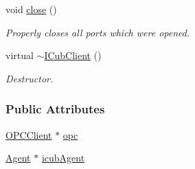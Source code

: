 \begin{DoxyCompactItemize}
void \hyperlink{group__icubclient__clients_a928939e68435d8f143883675eb0183af}{close} ()
\begin{DoxyCompactList}\small\item\em Properly closes all ports which were opened. \end{DoxyCompactList}\item 
virtual \hyperlink{group__icubclient__clients_a8a3081520380059d11ca3c72a36de58d}{$\sim$\+I\+Cub\+Client} ()
\begin{DoxyCompactList}\small\item\em Destructor. \end{DoxyCompactList}\end{DoxyCompactItemize}
\subsubsection*{Public Attributes}
\begin{DoxyCompactItemize}
\item 
\hyperlink{group__icubclient__clients_classicubclient_1_1OPCClient}{O\+P\+C\+Client} $\ast$ \hyperlink{group__icubclient__clients_a2d3ed93e325adeb8cb1c11a5d6508821}{opc}
\item 
\hyperlink{group__icubclient__representations_classicubclient_1_1Agent}{Agent} $\ast$ \hyperlink{group__icubclient__clients_a331f874d5382777bb167d42bf10e8014}{icub\+Agent}
\end{DoxyCompactItemize}
